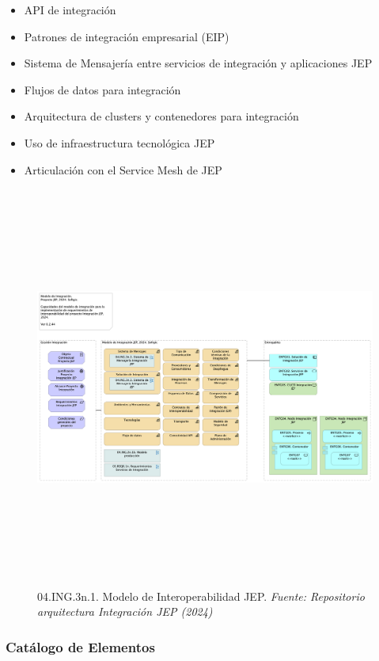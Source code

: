 \documentclass[
  paper=a4,
  ,captions=tableheading
]{scrartcl}
\providecommand{\tightlist}{%
  \setlength{\itemsep}{0pt}\setlength{\parskip}{0pt}}
\begin{document}
\begin{itemize}
\tightlist
\item
  API de integración
\item
  Patrones de integración empresarial (EIP)
\item
  Sistema de Mensajería entre servicios de integración y aplicaciones
  JEP
\item
  Flujos de datos para integración
\item
  Arquitectura de clusters y contenedores para integración
\item
  Uso de infraestructura tecnológica JEP
\item
  Articulación con el Service Mesh de JEP
\end{itemize}

\begin{figure}
\centering
\includegraphics[width=\textwidth,height=5.20833in]{images/04.ING.3n.1.ModelodeInteroperabilidadJEP.png}
\caption{04.ING.3n.1. Modelo de Interoperabilidad JEP. \emph{Fuente:
Repositorio arquitectura Integración JEP
(2024)}}\label{fig:id-f863abde3ea94046a77bf84d5cb0a3a8}
\end{figure}

\subsubsection{Catálogo de
Elementos}\label{sec:catuxe1logo-de-elementos-3}
\end{document}
